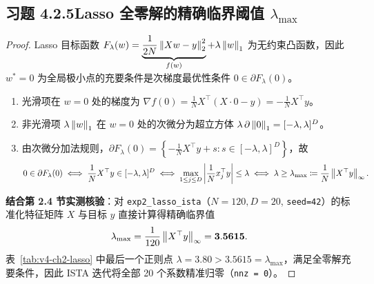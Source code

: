 \subsection*{习题 4.2.5\quad Lasso 全零解的精确临界阈值 $\lambda_{\max}$}
\begin{proof}
Lasso 目标函数 $F_\lambda(w) = \underbrace{\frac{1}{2N}\left\|Xw - y\right\|_2^2}_{f(w)} + \lambda\left\|w\right\|_1$ 为无约束凸函数，因此 $w^* = 0$ 为全局极小点的充要条件是次梯度最优性条件 $0 \in \partial F_\lambda(0)$。
\begin{enumerate}[label=(\arabic*), leftmargin=1.8em]
  \item 光滑项在 $w = 0$ 处的梯度为 $\nabla f(0) = \frac{1}{N}X^\top(X\cdot 0 - y) = -\frac{1}{N}X^\top y$。
  \item 非光滑项 $\lambda\left\|w\right\|_1$ 在 $w = 0$ 处的次微分为超立方体 $\lambda\,\partial\left\|0\right\|_1 = [-\lambda, \lambda]^D$。
  \item 由次微分加法规则，$\partial F_\lambda(0) = \left\{-\frac{1}{N}X^\top y + s : s \in [-\lambda, \lambda]^D\right\}$，故
  \[
    0 \in \partial F_\lambda(0)
    \iff \frac{1}{N}X^\top y \in [-\lambda, \lambda]^D
    \iff \max_{1\le j\le D}\left|\frac{1}{N}x_j^\top y\right| \le \lambda
    \iff \lambda \ge \lambda_{\max} \coloneqq \frac{1}{N}\left\|X^\top y\right\|_\infty.
  \]
\end{enumerate}
\textbf{结合第 2.4 节实测核验}：对 \texttt{exp2\_lasso\_ista}（$N=120, D=20$, \texttt{seed=42}）的标准化特征矩阵 $X$ 与目标 $y$ 直接计算得精确临界值
\[
  \lambda_{\max} = \frac{1}{120}\left\|X^\top y\right\|_\infty = \mathbf{3.5615}.
\]
表~\ref{tab:v4-ch2-lasso} 中最后一个正则点 $\lambda = 3.80 > 3.5615 = \lambda_{\max}$，满足全零解充要条件，因此 ISTA 迭代将全部 20 个系数精准归零（\texttt{nnz = 0}）。
\end{proof}

